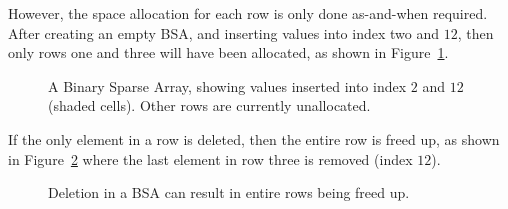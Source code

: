 However, the space allocation for each row is only done as-and-when
required. After creating an empty BSA, and inserting values into index
two and $12$, then only rows one and three will have been allocated,
as shown in Figure~\ref{fig:bsa2}.
\begin{figure}[ht]
\caption{A Binary Sparse Array, showing values inserted into index $2$ and $12$ (shaded cells).
Other rows are currently unallocated.}
\label{fig:bsa2}
\end{figure}

\noindent If the only element in a row is deleted, then the entire row is freed up, as shown
in Figure~\ref{fig:bsa3} where the last element in row three is removed (index $12$).
\begin{figure}[ht]
\caption{Deletion in a BSA can result in entire rows being freed up.}
\label{fig:bsa3}
\end{figure}


